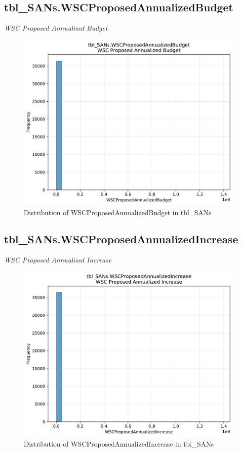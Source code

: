 \subsection{tbl\_SANs.WSCProposedAnnualizedBudget}
\textit{WSC Proposed Annualized Budget}

\begin{figure}[htbp]
\centering
\includegraphics[width=\textwidth]{figures/dbo_tbl_SANs_WSCProposedAnnualizedBudget.pdf}
\caption{Distribution of WSCProposedAnnualizedBudget in tbl\_SANs}
\end{figure}\newpage

\subsection{tbl\_SANs.WSCProposedAnnualizedIncrease}
\textit{WSC Proposed Annualized Increase}

\begin{figure}[htbp]
\centering
\includegraphics[width=\textwidth]{figures/dbo_tbl_SANs_WSCProposedAnnualizedIncrease.pdf}
\caption{Distribution of WSCProposedAnnualizedIncrease in tbl\_SANs}
\end{figure}\newpage

